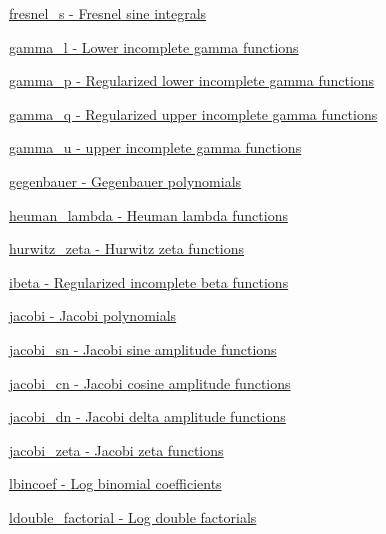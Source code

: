 \begin{DoxyItemize}
\item \hyperlink{group__gnu__math__spec__func_gaff40a89f169b1a8962ed0e75587c488b}{fresnel\+\_\+s -\/ Fresnel sine integrals}
\item \hyperlink{group__gnu__math__spec__func_gab3a75d57386806857b5f97c45b4ced6e}{gamma\+\_\+l -\/ Lower incomplete gamma functions}
\item \hyperlink{group__gnu__math__spec__func_ga7b31929f8a2368cff4d4304e3fd8a7be}{gamma\+\_\+p -\/ Regularized lower incomplete gamma functions}
\item \hyperlink{group__gnu__math__spec__func_ga6f8b617b9cbd4a822ee3328530372c9d}{gamma\+\_\+q -\/ Regularized upper incomplete gamma functions}
\item \hyperlink{group__gnu__math__spec__func_ga60911c010897719711d563edf69df44a}{gamma\+\_\+u -\/ upper incomplete gamma functions}
\item \hyperlink{group__gnu__math__spec__func_gaf295fecea6e26f1caeb7aa1560e9b7ee}{gegenbauer -\/ Gegenbauer polynomials}
\item \hyperlink{group__gnu__math__spec__func_ga3b606d8617459ef7e5d340db1bae13ec}{heuman\+\_\+lambda -\/ Heuman lambda functions}
\item \hyperlink{group__gnu__math__spec__func_gaed8e8bb0f1755fa7b0786d02ed574347}{hurwitz\+\_\+zeta -\/ Hurwitz zeta functions}
\item \hyperlink{group__gnu__math__spec__func_ga99e687949634408cd1050cceedbdf962}{ibeta -\/ Regularized incomplete beta functions}
\item \hyperlink{group__gnu__math__spec__func_gac7be4bf3c7588f932ce754ee340d0338}{jacobi -\/ Jacobi polynomials}
\item \hyperlink{group__gnu__math__spec__func_gad7e60d39a8b57a427eb8ca31c8d09e10}{jacobi\+\_\+sn -\/ Jacobi sine amplitude functions}
\item \hyperlink{group__gnu__math__spec__func_gaa49fc22cc0f9dde812bab5147fad23ca}{jacobi\+\_\+cn -\/ Jacobi cosine amplitude functions}
\item \hyperlink{group__gnu__math__spec__func_ga2be54b9c153b58a85d5ed9f1d0a02e21}{jacobi\+\_\+dn -\/ Jacobi delta amplitude functions}
\item \hyperlink{group__gnu__math__spec__func_gae22f0fc0fa1cac3bd0d3b3a4b2c33e7e}{jacobi\+\_\+zeta -\/ Jacobi zeta functions}
\item \hyperlink{group__gnu__math__spec__func_gab3eab510cd484f6ec75e968b1d98b818}{lbincoef -\/ Log binomial coefficients}
\item \hyperlink{group__gnu__math__spec__func_gac97a4a380940765948e0663fbc119544}{ldouble\+\_\+factorial -\/ Log double factorials}

\end{DoxyItemize}
